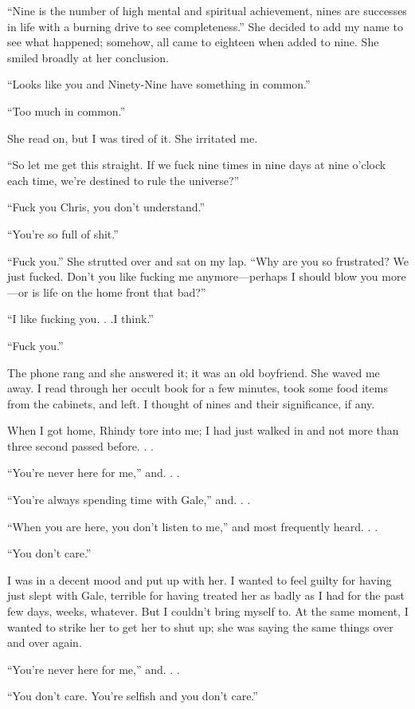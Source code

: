 ``Nine is the number of high mental and spiritual achievement, nines are
successes in life with a burning drive to see completeness.'' She
decided to add my name to see what happened; somehow, all came to
eighteen when added to nine. She smiled broadly at her conclusion.

``Looks like you and Ninety-Nine have something in common.''

``Too much in common.''

She read on, but I was tired of it. She irritated me.

``So let me get this straight. If we fuck nine times in nine days at
nine o'clock each time, we're destined to rule the universe?''

``Fuck you Chris, you don't understand.''

``You're so full of shit.''

``Fuck you.'' She strutted over and sat on my lap. ``Why are you so
frustrated? We just fucked. Don't you like fucking me anymore---perhaps
I should blow you more---or is life on the home front that bad?''

``I like fucking you. . .I think.''

``Fuck you.''

The phone rang and she answered it; it was an old boyfriend. She waved
me away. I read through her occult book for a few minutes, took some
food items from the cabinets, and left. I thought of nines and their
significance, if any.

When I got home, Rhindy tore into me; I had just walked in and not more
than three second passed before. . .

``You're never here for me,'' and. . .

``You're always spending time with Gale,'' and. . .

``When you are here, you don't listen to me,'' and most frequently
heard. . .

``You don't care.''

I was in a decent mood and put up with her. I wanted to feel guilty for
having just slept with Gale, terrible for having treated her as badly as
I had for the past few days, weeks, whatever. But I couldn't bring
myself to. At the same moment, I wanted to strike her to get her to shut
up; she was saying the same things over and over again.

``You're never here for me,'' and. . .

``You don't care. You're selfish and you don't care.''

